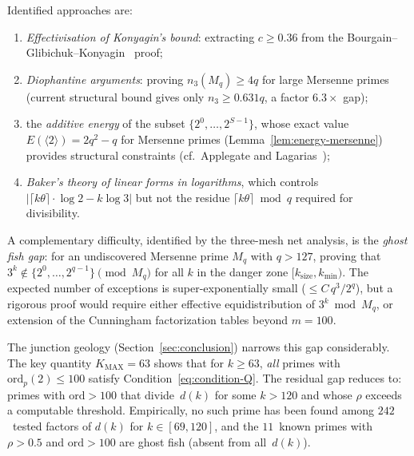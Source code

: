\documentclass[12pt, a4paper]{amsart}
\theoremstyle{plain}
\theoremstyle{definition}
\theoremstyle{remark}
\newcommand{\ord}{\mathrm{ord}}
\begin{document}
Identified approaches are:
\begin{enumerate}[label=(\alph*)]
  \item \emph{Effectivisation of Konyagin's bound}: extracting
    $c \geq 0.36$ from the Bourgain--Glibichuk--Konyagin~\cite{BGK2006} proof;
  \item \emph{Diophantine arguments}: proving $n_3(M_q) \geq 4q$
    for large Mersenne primes (current structural bound gives
    only $n_3 \geq 0.631q$, a factor $6.3\times$ gap);
  \item the \emph{additive energy} of the subset
    $\{2^0, \ldots, 2^{S-1}\}$, whose exact value
    $E(\langle 2 \rangle) = 2q^2 - q$ for Mersenne primes
    (Lemma~\ref{lem:energy-mersenne}) provides
    structural constraints
    (cf.~Applegate and
    Lagarias~\cite{AppLegateLagarias2006});
  \item \emph{Baker's theory of linear forms in logarithms},
    which controls $|\lceil k\theta \rceil \cdot \log 2 - k \log 3|$
    but not the residue $\lceil k\theta \rceil \bmod q$
    required for divisibility.
\end{enumerate}
A complementary difficulty, identified by the three-mesh net
analysis, is the \emph{ghost fish gap}: for an undiscovered
Mersenne prime $M_q$ with $q > 127$, proving that
$3^k \notin \{2^0, \ldots, 2^{q-1}\} \pmod{M_q}$
for all $k$ in the danger zone $[k_{\mathrm{size}}, k_{\min})$.
The expected number of exceptions is super-exponentially small
($\leq C\,q^3/2^q$), but a rigorous proof would require either
effective equidistribution of $3^k \bmod M_q$, or extension of
the Cunningham factorization tables beyond $m = 100$.

The junction geology (Section~\ref{sec:conclusion}) narrows
this gap considerably.
The key quantity $K_{\mathrm{MAX}} = 63$ shows that
for $k \geq 63$, \emph{all} primes with $\ord_p(2) \leq 100$
satisfy Condition~\eqref{eq:condition-Q}.
The residual gap reduces to: primes with $\ord > 100$ that
divide~$d(k)$ for some $k > 120$ and whose $\rho$ exceeds
a computable threshold.
Empirically, no such prime has been found among $242$~tested
factors of $d(k)$ for $k \in [69, 120]$, and the
$11$~known primes with $\rho > 0.5$ and $\ord > 100$ are
ghost fish (absent from all~$d(k)$).
\end{document}
